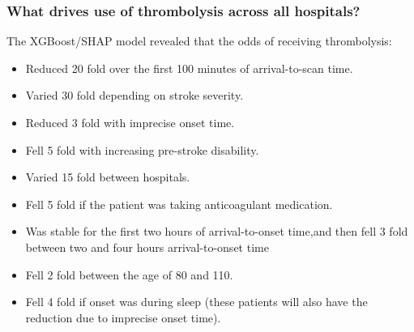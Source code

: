 \begin{frame}
\frametitle{What drives use of thrombolysis across all hospitals?}

The XGBoost/SHAP model revealed that the odds of receiving thrombolysis:

\vspace{2mm}

\begin{itemize}
    \setlength{\itemsep}{1.5mm}
    \item Reduced 20 fold over the first 100 minutes of arrival-to-scan time.
    \item Varied 30 fold depending on stroke severity.
    \item Reduced 3 fold with imprecise onset time.
    \item Fell 5 fold with increasing pre-stroke disability.
    \item Varied 15 fold between hospitals. 
    \item Fell 5 fold if the patient was taking anticoagulant medication.
    \item Was stable for the first two hours of arrival-to-onset time,and then fell 3 fold between two and four hours arrival-to-onset time
    \item Fell 2 fold between the age of 80 and 110.
    \item Fell 4 fold if onset was during sleep (these patients will also have the reduction due to imprecise onset time). 
\end{itemize}

\end{frame}